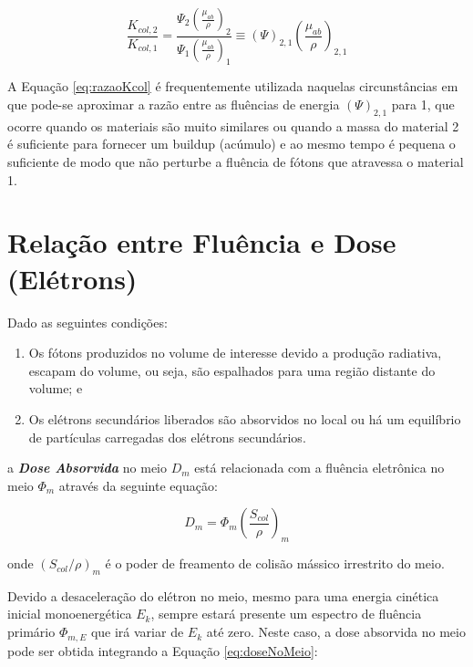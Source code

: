 \documentclass[11pt,a4paper]{article}
\begin{document}
		\begin{equation}
			\frac{K_{col,2}}{K_{col, 1}} = \frac{\Psi_2 \left(\frac{\mu_{ab}}{\rho}\right)_2}{\Psi_1 \left(\frac{\mu_{ab}}{\rho}\right)_1}
			\equiv \left(\Psi \right)_{2,1}\left(\frac{\mu_{ab}}{\rho}\right)_{2,1}
			\label{eq:razaoKcol}
		\end{equation}

		A Equação \ref{eq:razaoKcol} é frequentemente utilizada naquelas circunstâncias em que pode-se aproximar a razão entre as fluências de energia $(\Psi)_{2,1}$ para 1, que ocorre quando os materiais são muito similares ou quando a massa do material 2 é suficiente para fornecer um buildup (acúmulo) e ao mesmo tempo é pequena o suficiente de modo que não perturbe a fluência de fótons que atravessa o material 1.


	\section{Relação entre Fluência e Dose (Elétrons)}

		Dado as seguintes condições:

		\begin{enumerate}
			\item Os fótons produzidos no volume de interesse devido a produção radiativa, escapam do volume, ou seja, são espalhados para uma região distante do volume; e
			\item Os elétrons secundários liberados são absorvidos no local ou há um equilíbrio de partículas carregadas dos elétrons secundários.
		\end{enumerate}

		\noindent a \textbf{\textit{\textcolor{CarnationPink}{Dose Absorvida}}} no meio $D_{m}$ está relacionada com a fluência eletrônica no meio $\Phi_{m}$ através da seguinte equação:

			\begin{equation}
				D_m = \Phi_m \left(\frac{S_{col}}{\rho}\right)_m
				\label{eq:doseNoMeio}
			\end{equation}

		\noindent onde $(S_{col}/\rho)_m$ é o poder de freamento de colisão mássico irrestrito do meio.

		Devido a desaceleração do elétron no meio, mesmo para uma energia cinética inicial monoenergética $E_k$, sempre estará presente um espectro de fluência primário $\Phi_{m,E}$ que irá variar de $E_k$ até zero. Neste caso, a dose absorvida no meio pode ser obtida integrando a Equação \ref{eq:doseNoMeio}:
\end{document}
